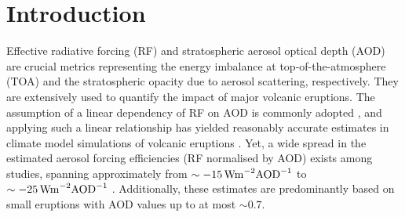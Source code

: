\documentclass[draft]{agujournal2019}
\begin{document}

\section{Introduction}



Effective radiative forcing (RF) and stratospheric aerosol optical depth (AOD) are
crucial metrics representing the energy imbalance at top-of-the-atmosphere (TOA) and the
stratospheric opacity due to aerosol scattering, respectively. They are extensively used
to quantify the impact of major volcanic eruptions. The assumption of a linear
dependency of RF on AOD is commonly adopted \cite{myhre2013,andersson2015}, and applying
such a linear relationship has yielded reasonably accurate estimates in climate model
simulations of volcanic eruptions
\cite{mills2017,hansen2005,gregory2016,marshall2020,pitari2016b}. Yet, a wide spread in
the estimated aerosol forcing efficiencies (RF normalised by AOD) exists among studies,
spanning approximately from \(\sim \SI{-15}{\watt\metre^{-2}\ce{AOD}^{-1}}\)
\cite{pitari2016b} to \(\sim \SI{-25}{\watt\metre^{-2}\ce{AOD}^{-1}}\) \cite{myhre2013}.
Additionally, these estimates are predominantly based on small eruptions with AOD values
up to at most \(\sim 0.7\).
\end{document}
